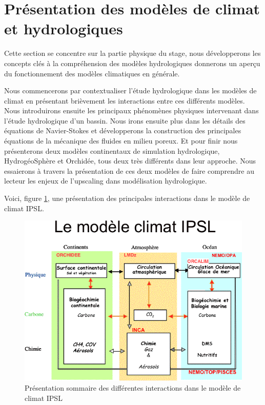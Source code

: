 \documentclass[a4paper,11pt]{article}
\numberwithin{equation}{section}
\begin{document}
\newpage
\section{Présentation des modèles de climat et hydrologiques}
\label{ch:presentation modele climat}

Cette section se concentre sur la partie physique du stage, nous développerons les concepts clés à la compréhension des modèles hydrologiques donnerons un aperçu du fonctionnement des modèles climatiques en générale. 

\vspace{0.7cm}

Nous commencerons par contextualiser l'étude hydrologique dans les modèles de climat en présentant brièvement les interactions entre ces différents modèles. Nous introduirons ensuite les principaux phénomènes physiques intervenant dans l'étude hydrologique d'un bassin. Nous irons ensuite plus dans les détails des équations de Navier-Stokes et développerons la construction des principales équations de la mécanique des fluides en milieu poreux. Et pour finir nous présenterons deux modèles continentaux de simulation hydrologique, HydrogéoSphère et Orchidée, tous deux très différents dans leur approche. Nous essaierons à travers la présentation de ces deux modèles de faire comprendre au lecteur les enjeux de l'upscaling dans modélisation hydrologique.

Voici, figure \ref{fig-modele de climat}, une présentation des principales interactions dans le modèle de climat IPSL.

\begin{figure}[H]
	\begin{center}
		\includegraphics[scale=0.6]{modele_climat_IPSL.png}
	\end{center}
	\caption{Présentation sommaire des différentes interactions dans le modèle de climat IPSL}
	\label{fig-modele de climat}
\end{figure}
\end{document}
